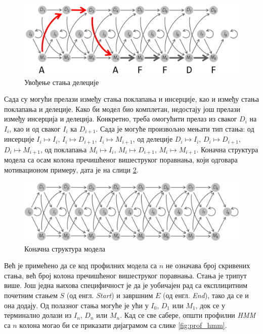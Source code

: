 \documentclass[12pt,oneside]{memoir}
\begin{document}
\begin{CJK}{UTF8}{ipxm}
\begin{figure}[H]
  \centering
  \includegraphics[width=\textwidth]{delecije2.png}
  \caption{Увођење стања делеције\cite{compeau2015}}
  \label{fig:delecije2}
\end{figure}

Сада су могући прелази између стања поклапања и инсерције, као и између стања поклапања и делеције. Како би модел био комплетан, недостају још прелази између инсерција и делеција. Конкретно, треба омогућити прелаз из сваког $D_i$ на $I_i$, као и од сваког $I_i$ ка $D_{i+1}$. Сада је могуће произвољно мењати тип стања: од инсерције $I_i \mapsto I_i$, $I_i \mapsto D_{i+1}$, $I_i \mapsto M_{i+1}$, од делеције $D_i \mapsto I_i$, $D_i \mapsto D_{i+1}$, $D_i \mapsto M_{i+1}$, од поклапања $M_i \mapsto I_i$, $M_i \mapsto D_{i+1}$, $M_i \mapsto M_{i+1}$. Коначна структура модела са осам колона пречишћеног вишеструког поравнања, који одговара мотивационом примеру, дата је на слици \ref{fig:indeli}.

\begin{figure}[H]
  \centering
  \includegraphics[width=\textwidth]{indeli.png}
  \caption{Коначна структура модела\cite{compeau2015}}
  \label{fig:indeli}
\end{figure}

Већ је примећено да се код профилних модела са $n$ не означава број скривених стања, већ број колона пречишћеног вишеструког поравнања. Стања је трипут више. Још једна њихова специфичност је да је уобичајен рад са експлицитним почетним стањем $S$ (од енгл. \textit{Start}) и завршним $E$ (од енгл. \textit{End}), тако да се и она додају. Од полазног стања могуће је ући у $I_0$, $D_1$ или $M_1$, док се у терминално долази из $I_n$, $D_n$ или $M_n$. Кад се све сабере, општи профилни \textit{HMM} са $n$ колона могао би се приказати дијаграмом са слике \ref{fig:prof_hmm}.


\end{CJK}
\end{document}
